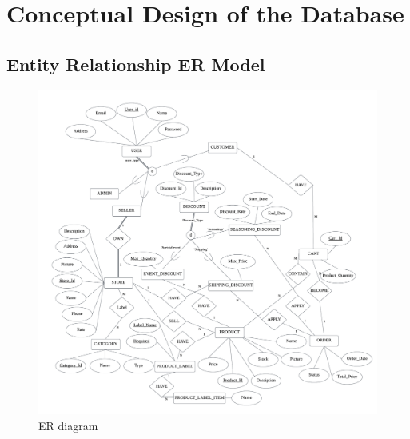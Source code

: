 \documentclass[a4paper, 12pt]{article}
\begin{document}
\newpage

\section{Conceptual Design of the Database}
\subsection{Entity Relationship ER Model}

\begin{figure}[h]
    \centerline{\includegraphics[width=40em]{ER-diagram.png}}
    \caption{ER diagram}
    \label{fig:enter-label}
\end{figure}

\newpage
\end{document}
